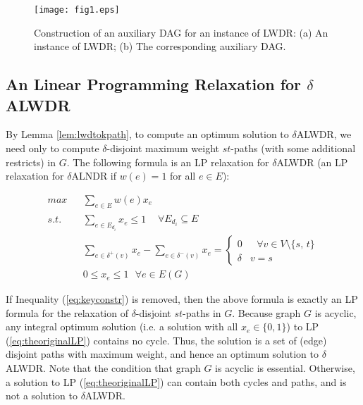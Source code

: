 \documentclass[11pt,english,onecolumn,draftcls]{IEEEtran}
\theoremstyle{plain}
\theoremstyle{plain}
\theoremstyle{plain}
\theoremstyle{plain}
\begin{document}
\begin{figure*}
\texttt{[image: fig1.eps]}

\protect\caption{\label{fig:Construction-of-an}Construction of an auxiliary DAG for
an instance of LWDR: (a) An instance of LWDR; (b) The corresponding
auxiliary DAG. }
\end{figure*}



\subsection{An Linear Programming Relaxation for $\delta$ALWDR }

By Lemma \ref{lem:lwdtokpath}, to compute an optimum solution to
$\delta$ALWDR, we need only to compute $\delta$-disjoint maximum
weight $st$-paths (with some additional restricts) in $G$. The following
formula is an LP relaxation for $\delta$ALWDR (an LP relaxation for
$\delta$ALNDR if $w(e)=1$ for all $e\in E$):

\begin{eqnarray}
max &  & \sum_{e\in E}w(e)x_{e}\label{eq:theoriginalLP}\\
s.t. &  & \sum_{e\in E_{d_{i}}}x_{e}\leq1\begin{array}{cc}
 & \forall E_{d_{i}}\subseteq E\end{array}\label{eq:keyconstr}\\
 &  & \sum_{e\in\delta^{+}(v)}x_{e}-\sum_{e\in\delta^{-}(v)}x_{e}=\left\{ \begin{array}{cc}
0 & \mbox{ }\forall v\in V\setminus\{s,\, t\}\\
\delta & v=s
\end{array}\right.\label{eq:unimo}\\
 &  & 0\leq x_{e}\leq1\mbox{ }\forall e\in E(G)\label{eq:constrxe}
\end{eqnarray}


If Inequality (\ref{eq:keyconstr}) is removed, then the above formula
is exactly an LP formula for the relaxation of $\delta$-disjoint
$st$-paths in $G$. Because graph $G$ is acyclic, any integral optimum
solution (i.e. a solution with all $x_{e}\in\{0,1\}$) to LP (\ref{eq:theoriginalLP})
contains no cycle. Thus, the solution is a set of (edge) disjoint
paths with maximum weight, and hence an optimum solution to $\delta$ALWDR.
Note that the condition that graph $G$ is acyclic is essential. Otherwise,
a solution to LP (\ref{eq:theoriginalLP}) can contain both cycles
and paths, and is not a solution to $\delta$ALWDR.
\end{document}
